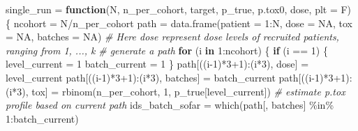 \documentclass[
]{article}
\newenvironment{Shaded}{\begin{snugshade}}{\end{snugshade}}
\newcommand{\AttributeTok}[1]{\textcolor[rgb]{0.77,0.63,0.00}{#1}}
\newcommand{\CommentTok}[1]{\textcolor[rgb]{0.56,0.35,0.01}{\textit{#1}}}
\newcommand{\ConstantTok}[1]{\textcolor[rgb]{0.00,0.00,0.00}{#1}}
\newcommand{\ControlFlowTok}[1]{\textcolor[rgb]{0.13,0.29,0.53}{\textbf{#1}}}
\newcommand{\DecValTok}[1]{\textcolor[rgb]{0.00,0.00,0.81}{#1}}
\newcommand{\FunctionTok}[1]{\textcolor[rgb]{0.00,0.00,0.00}{#1}}
\newcommand{\NormalTok}[1]{#1}
\newcommand{\OtherTok}[1]{\textcolor[rgb]{0.56,0.35,0.01}{#1}}
\newcommand{\SpecialCharTok}[1]{\textcolor[rgb]{0.00,0.00,0.00}{#1}}
\newcommand{\StringTok}[1]{\textcolor[rgb]{0.31,0.60,0.02}{#1}}
\begin{document}
\begin{Shaded}
\begin{Highlighting}[]
\NormalTok{single\_run }\OtherTok{=} \ControlFlowTok{function}\NormalTok{(N, n\_per\_cohort, target, p\_true, p.tox0, dose, }\AttributeTok{plt =}\NormalTok{ F) \{}
\NormalTok{ncohort }\OtherTok{=}\NormalTok{ N}\SpecialCharTok{/}\NormalTok{n\_per\_cohort}
\NormalTok{path }\OtherTok{=} \FunctionTok{data.frame}\NormalTok{(}\AttributeTok{patient =} \DecValTok{1}\SpecialCharTok{:}\NormalTok{N, }\AttributeTok{dose =} \ConstantTok{NA}\NormalTok{, }\AttributeTok{tox =} \ConstantTok{NA}\NormalTok{, }\AttributeTok{batches =} \ConstantTok{NA}\NormalTok{)}
\CommentTok{\# Here dose represent dose levels of recruited patients, ranging from 1, ..., k}
\CommentTok{\# generate a path}
\ControlFlowTok{for}\NormalTok{ (i }\ControlFlowTok{in} \DecValTok{1}\SpecialCharTok{:}\NormalTok{ncohort) \{}
\ControlFlowTok{if}\NormalTok{ (i }\SpecialCharTok{==} \DecValTok{1}\NormalTok{) \{}
\NormalTok{level\_current }\OtherTok{=} \DecValTok{1}
\NormalTok{batch\_current }\OtherTok{=} \DecValTok{1}
\NormalTok{\}}
\NormalTok{path[((i}\DecValTok{{-}1}\NormalTok{)}\SpecialCharTok{*}\DecValTok{3}\SpecialCharTok{+}\DecValTok{1}\NormalTok{)}\SpecialCharTok{:}\NormalTok{(i}\SpecialCharTok{*}\DecValTok{3}\NormalTok{), }\StringTok{\textquotesingle{}dose\textquotesingle{}}\NormalTok{]  }\OtherTok{=}\NormalTok{ level\_current}
\NormalTok{path[((i}\DecValTok{{-}1}\NormalTok{)}\SpecialCharTok{*}\DecValTok{3}\SpecialCharTok{+}\DecValTok{1}\NormalTok{)}\SpecialCharTok{:}\NormalTok{(i}\SpecialCharTok{*}\DecValTok{3}\NormalTok{), }\StringTok{\textquotesingle{}batches\textquotesingle{}}\NormalTok{] }\OtherTok{=}\NormalTok{ batch\_current}
\NormalTok{path[((i}\DecValTok{{-}1}\NormalTok{)}\SpecialCharTok{*}\DecValTok{3}\SpecialCharTok{+}\DecValTok{1}\NormalTok{)}\SpecialCharTok{:}\NormalTok{(i}\SpecialCharTok{*}\DecValTok{3}\NormalTok{), }\StringTok{\textquotesingle{}tox\textquotesingle{}}\NormalTok{] }\OtherTok{=} \FunctionTok{rbinom}\NormalTok{(n\_per\_cohort, }\DecValTok{1}\NormalTok{, p\_true[level\_current])}
\CommentTok{\# estimate p.tox profile based on current path}
\NormalTok{ids\_batch\_sofar }\OtherTok{=} \FunctionTok{which}\NormalTok{(path[, }\StringTok{\textquotesingle{}batches\textquotesingle{}}\NormalTok{] }\SpecialCharTok{\%in\%} \DecValTok{1}\SpecialCharTok{:}\NormalTok{batch\_current)}

\end{Highlighting}
\end{Shaded}
\end{document}
